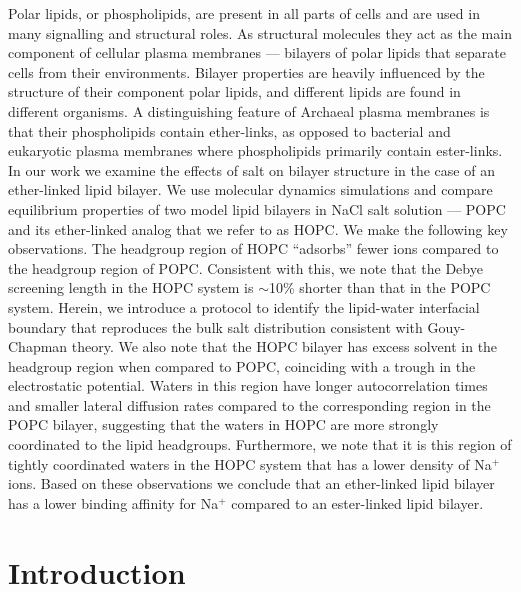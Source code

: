 \documentclass[12pt,openany,final]{book}
\newcommand{\about}{$\sim$}
\begin{document}
Polar lipids, or phospholipids, are present in all parts of cells
and are used in many signalling and structural roles.
As structural molecules they act as the main component of cellular plasma membranes --- bilayers
of polar lipids that separate cells from their environments. Bilayer properties are heavily
influenced by the structure of their component polar lipids, and different lipids
are found in different organisms. 
A distinguishing feature of Archaeal plasma membranes is that their phospholipids contain ether-links, as opposed to bacterial and eukaryotic plasma
membranes where phospholipids primarily contain ester-links. In our work we examine the effects of
salt on bilayer structure in the case of an ether-linked lipid bilayer. We use molecular dynamics simulations and compare equilibrium properties of two model lipid
bilayers in NaCl salt solution --- POPC and its ether-linked analog that we refer to as HOPC. We make the following key observations.
The headgroup region of HOPC ``adsorbs'' fewer ions compared to the headgroup region of POPC. Consistent with this,
we note that the Debye screening length in the HOPC system is \about 10\% shorter than that
in the POPC system. Herein, we introduce a protocol to identify the lipid-water interfacial boundary that
reproduces the bulk salt distribution consistent with
Gouy-Chapman theory. We also note that the HOPC bilayer has excess solvent
in the headgroup region when compared to POPC,
coinciding with a trough in the electrostatic potential. Waters in
this region have longer autocorrelation times and smaller lateral diffusion rates compared to the corresponding region
in the POPC bilayer, suggesting that the waters in HOPC are more strongly
coordinated to the lipid headgroups. Furthermore, we note that it is this
region of tightly coordinated waters in the HOPC system that has a lower density of Na$^+$ ions.
Based on these observations we conclude that an ether-linked lipid bilayer has a lower binding
affinity for Na$^+$ compared to an ester-linked lipid bilayer.

\chapter{Introduction}
\linenumbers
{}
\end{document}

